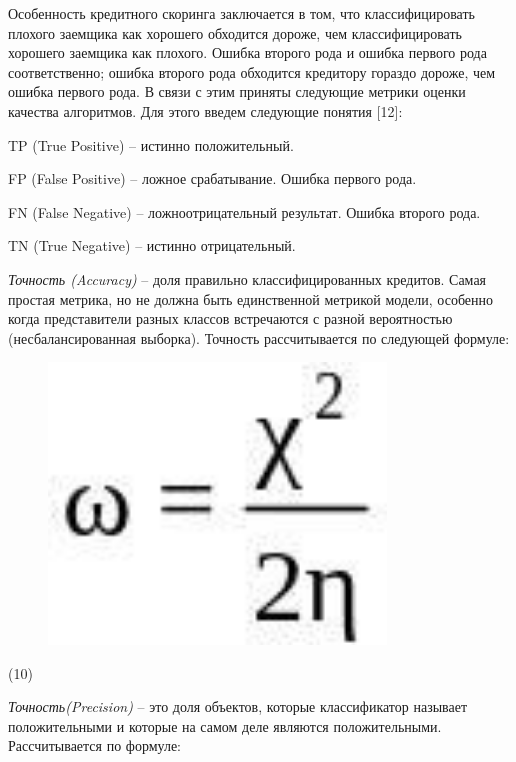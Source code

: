 Особенность кредитного скоринга заключается в том, что классифицировать
плохого заемщика как хорошего обходится дороже, чем классифицировать
хорошего заемщика как плохого. Ошибка второго рода и ошибка первого рода
соответственно; ошибка второго рода обходится кредитору гораздо дороже,
чем ошибка первого рода. В связи с этим приняты следующие метрики оценки
качества алгоритмов. Для этого введем следующие понятия {[}12{]}:

TP (True Positive) -- истинно положительный.

FP (False Positive) -- ложное срабатывание. Ошибка первого рода.

FN (False Negative) -- ложноотрицательный результат. Ошибка второго
рода.

TN (True Negative) -- истинно отрицательный.

\emph{Точность (Accuracy)} -- доля правильно классифицированных
кредитов. Самая простая метрика, но не должна быть единственной метрикой
модели, особенно когда представители разных классов встречаются с разной
вероятностью (несбалансированная выборка). Точность рассчитывается по
следующей формуле:

\begin{figure}[H]
	\centering
	\includegraphics[width=0.8\textwidth]{assets/35}
	\caption*{}
\end{figure} (10)

\emph{Точность(Precision)} -- это доля объектов, которые классификатор
называет положительными и которые на самом деле являются положительными.
Рассчитывается по формуле:

